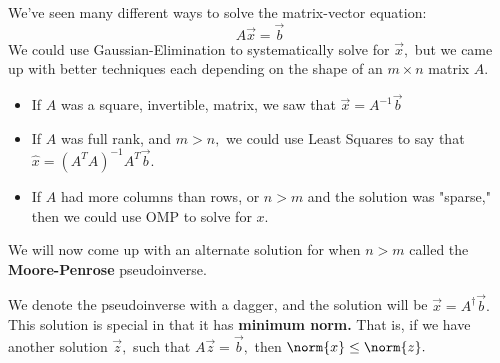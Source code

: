 


We've seen many different ways to solve the matrix-vector equation:
\begin{equation}
  A \vec{x} = \vec{b}
\end{equation}
We could use Gaussian-Elimination to systematically solve for $\vec{x},$ but we came up with better techniques each depending on the shape of an $m \times n$ matrix $A.$
\begin{itemize}
  \item If $A$ was a square, invertible, matrix, we saw that $\vec{x} = A^{-1} \vec{b}$
  \item If $A$ was full rank, and $m > n,$ we could use Least Squares to say that $\hat{x} = (A^{T} A)^{-1} A^{T} \vec{b}.$
  \item If $A$ had more columns than rows, or $n > m$ and the solution was "sparse," then we could use OMP to solve for $x.$
\end{itemize}
We will now come up with an alternate solution for when $n > m$ called the \textbf{Moore-Penrose} pseudoinverse.

We denote the pseudoinverse with a dagger, and the solution will be $\vec{x} = A^{\dagger} \vec{b}.$
This solution is special in that it has \textbf{minimum norm.} That is, if we have another solution $\vec{z},$ such that $A \vec{z} = \vec{b},$ then $\norm{x} \leq \norm{z}.$

